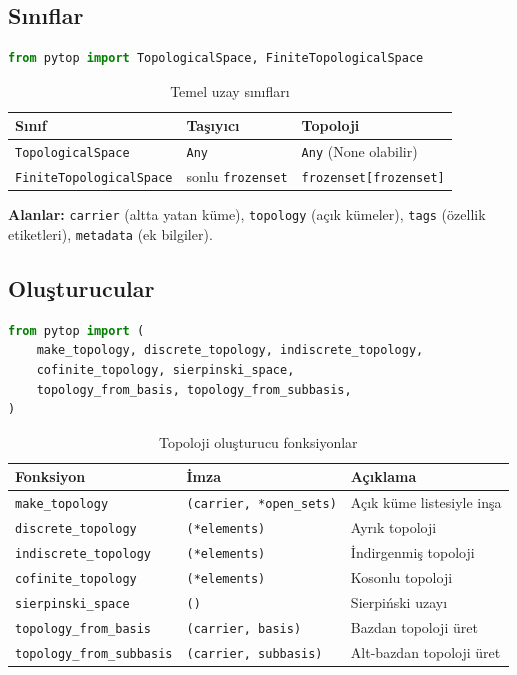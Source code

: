 \subsection{Sınıflar}

\begin{lstlisting}[language=Python, caption={Temel sınıf importları}]
from pytop import TopologicalSpace, FiniteTopologicalSpace
\end{lstlisting}

\begin{table}[h]
\centering
\begin{tabular}{lll}
\toprule
\textbf{Sınıf} & \textbf{Taşıyıcı} & \textbf{Topoloji} \\
\midrule
\texttt{TopologicalSpace} & \texttt{Any} & \texttt{Any} (None olabilir) \\
\texttt{FiniteTopologicalSpace} & sonlu \texttt{frozenset} & \texttt{frozenset[frozenset]} \\
\bottomrule
\end{tabular}
\caption{Temel uzay sınıfları}
\end{table}

\noindent\textbf{Alanlar:} \texttt{carrier} (altta yatan küme), \texttt{topology}
(açık kümeler), \texttt{tags} (özellik etiketleri), \texttt{metadata} (ek bilgiler).

\subsection{Oluşturucular}

\begin{lstlisting}[language=Python, caption={Topoloji oluşturucu importları}]
from pytop import (
    make_topology, discrete_topology, indiscrete_topology,
    cofinite_topology, sierpinski_space,
    topology_from_basis, topology_from_subbasis,
)
\end{lstlisting}

\begin{table}[h]
\centering
\begin{tabular}{lll}
\toprule
\textbf{Fonksiyon} & \textbf{İmza} & \textbf{Açıklama} \\
\midrule
\texttt{make\_topology} & \texttt{(carrier, *open\_sets)} & Açık küme listesiyle inşa \\
\texttt{discrete\_topology} & \texttt{(*elements)} & Ayrık topoloji \\
\texttt{indiscrete\_topology} & \texttt{(*elements)} & İndirgenmiş topoloji \\
\texttt{cofinite\_topology} & \texttt{(*elements)} & Kosonlu topoloji \\
\texttt{sierpinski\_space} & \texttt{()} & Sierpiński uzayı \\
\texttt{topology\_from\_basis} & \texttt{(carrier, basis)} & Bazdan topoloji üret \\
\texttt{topology\_from\_subbasis} & \texttt{(carrier, subbasis)} & Alt-bazdan topoloji üret \\
\bottomrule
\end{tabular}
\caption{Topoloji oluşturucu fonksiyonlar}
\end{table}

